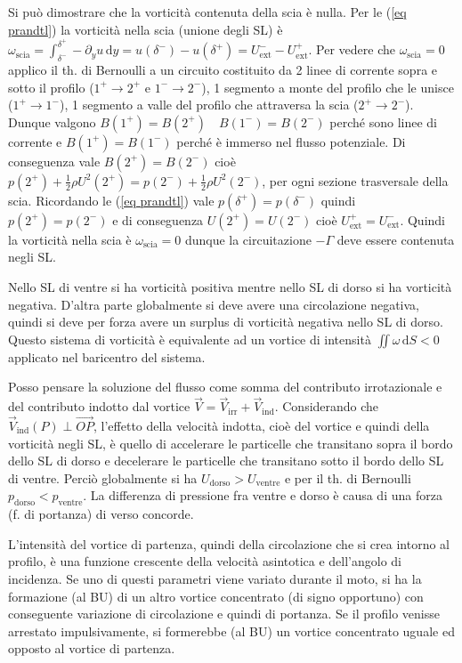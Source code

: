 \documentclass[11pt,a4paper]{report}
\newcommand{\de}{\mathrm d}
\begin{document}
	Si può dimostrare che la vorticità contenuta della scia è nulla. Per le (\ref{eq prandtl}) la vorticità nella scia (unione degli SL) è $\omega_\mathrm{scia}=\int_{\delta^-}^{\delta^+}-\partial_yu\,\de y=u(\delta^-)-u(\delta^+)=U_\mathrm{ext}^--U_\mathrm{ext}^+$. Per vedere che $\omega_\mathrm{scia}=0$ applico il th. di Bernoulli a un circuito costituito da 2 linee di corrente sopra e sotto il profilo ($1^+\!\to\!2^+$ e $1^-\!\to \!2^-$), 1 segmento a monte del profilo che le unisce ($1^+\!\to\!1^-$), 1 segmento a valle del profilo che attraversa la scia ($2^+\!\to\!2^-$). Dunque valgono $B(1^+)=B(2^+)\quad B(1^-)=B(2^-)$ perché sono linee di corrente e $B(1^+)=B(1^-)$ perché è immerso nel flusso potenziale. Di conseguenza vale $B(2^+)=B(2^-)$ cioè $p(2^+)+\frac 12\rho U^2(2^+)=p(2^-)+\frac 12\rho U^2(2^-)$, per ogni sezione trasversale della scia. Ricordando le (\ref{eq prandtl}) vale $p(\delta^+)=p(\delta^-)$ quindi $p(2^+)=p(2^-)$ e di conseguenza $U(2^+)=U(2^-)$ cioè $U_\mathrm{ext}^+=U_\mathrm{ext}^-$. Quindi la vorticità nella scia è $\omega_\mathrm{scia}=0$ dunque la circuitazione $-\Gamma$ deve essere contenuta negli SL.
	
	Nello SL di ventre si ha vorticità positiva mentre nello SL di dorso si ha vorticità negativa. D'altra parte globalmente si deve avere una circolazione negativa, quindi si deve per forza avere un surplus di vorticità negativa nello SL di dorso. Questo sistema di vorticità è equivalente ad un vortice di intensità $\iint\omega\,\de S<0$ applicato nel baricentro del sistema.

        Posso pensare la soluzione del flusso come somma del contributo irrotazionale e del contributo indotto dal vortice $\vec V=\vec V_\mathrm{irr}+\vec V_\mathrm{ind}$. Considerando che $\vec V_\mathrm{ind}(P)\perp\overrightarrow{OP}$, l'effetto della velocità indotta, cioè del vortice e quindi della vorticità negli SL, è quello di accelerare le particelle che transitano sopra il bordo dello SL di dorso e decelerare le particelle che transitano sotto il bordo dello SL di ventre. Perciò globalmente si ha $U_\mathrm{dorso}>U_\mathrm{ventre}$ e per il th. di Bernoulli $p_\mathrm{dorso}<p_\mathrm{ventre}$. La differenza di pressione fra ventre e dorso è causa di una forza (f. di portanza) di verso concorde.
	
        L'intensità del vortice di partenza, quindi della circolazione che si crea intorno al profilo, è una funzione crescente della velocità asintotica e dell'angolo di incidenza. Se uno di questi parametri viene variato durante il moto, si ha la formazione (al BU) di un altro vortice concentrato (di signo opportuno)  con conseguente variazione di circolazione e quindi di portanza. Se il profilo venisse arrestato impulsivamente, si formerebbe (al BU) un vortice concentrato uguale ed opposto al vortice di partenza.
        
\end{document}
